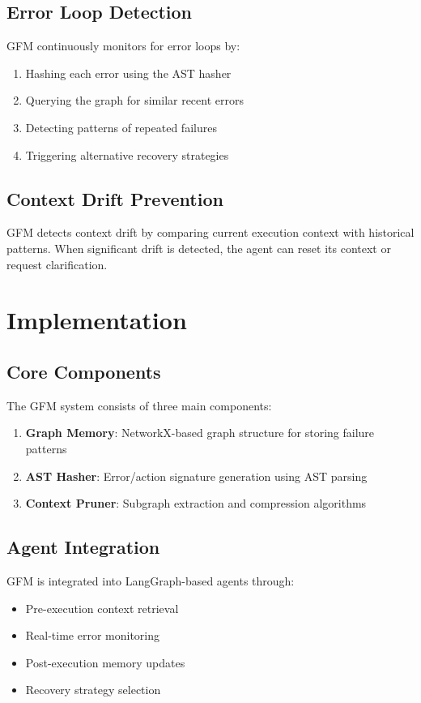 \documentclass{conference}
\begin{document}
\subsection{Error Loop Detection}
GFM continuously monitors for error loops by:
\begin{enumerate}
    \item Hashing each error using the AST hasher
    \item Querying the graph for similar recent errors
    \item Detecting patterns of repeated failures
    \item Triggering alternative recovery strategies
\end{enumerate}

\subsection{Context Drift Prevention}
GFM detects context drift by comparing current execution context with historical patterns. When significant drift is detected, the agent can reset its context or request clarification.

\section{Implementation}

\subsection{Core Components}
The GFM system consists of three main components:
\begin{enumerate}
    \item \textbf{Graph Memory}: NetworkX-based graph structure for storing failure patterns
    \item \textbf{AST Hasher}: Error/action signature generation using AST parsing
    \item \textbf{Context Pruner}: Subgraph extraction and compression algorithms
\end{enumerate}

\subsection{Agent Integration}
GFM is integrated into LangGraph-based agents through:
\begin{itemize}
    \item Pre-execution context retrieval
    \item Real-time error monitoring
    \item Post-execution memory updates
    \item Recovery strategy selection
\end{itemize}
\end{document}
